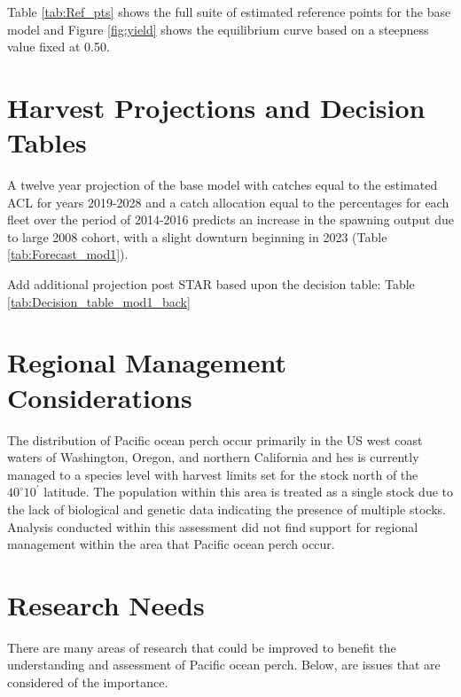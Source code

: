\documentclass[12pt,]{article}
\begin{document}
Table \ref{tab:Ref_pts} shows the full suite of estimated reference
points for the base model and Figure \ref{fig:yield} shows the
equilibrium curve based on a steepness value fixed at 0.50.

\section{Harvest Projections and Decision
Tables}\label{harvest-projections-and-decision-tables}

A twelve year projection of the base model with catches equal to the
estimated ACL for years 2019-2028 and a catch allocation equal to the
percentages for each fleet over the period of 2014-2016 predicts an
increase in the spawning output due to large 2008 cohort, with a slight
downturn beginning in 2023 (Table \ref{tab:Forecast_mod1}).

Add additional projection post STAR based upon the decision table: Table
\ref{tab:Decision_table_mod1_back}

\section{Regional Management
Considerations}\label{regional-management-considerations}

The distribution of Pacific ocean perch occur primarily in the US west
coast waters of Washington, Oregon, and northern California and hes is
currently managed to a species level with harvest limits set for the
stock north of the \(40^\circ 10^\prime\) latitude. The population
within this area is treated as a single stock due to the lack of
biological and genetic data indicating the presence of multiple stocks.
Analysis conducted within this assessment did not find support for
regional management within the area that Pacific ocean perch occur.

\section{Research Needs}\label{research-needs}

There are many areas of research that could be improved to benefit the
understanding and assessment of Pacific ocean perch. Below, are issues
that are considered of the importance.
\end{document}

